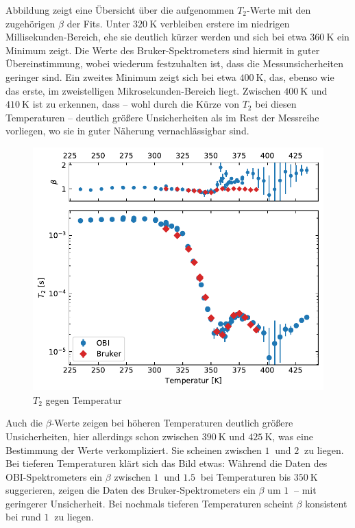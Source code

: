 Abbildung \label{fig:res:T_2} zeigt eine Übersicht über die aufgenommen $T_2$-Werte mit den zugehörigen $\beta$ der Fits. Unter $\SI{320}{\kelvin}$ verbleiben erstere im niedrigen Millisekunden-Bereich, ehe sie deutlich kürzer werden und sich bei etwa $\SI{360}{\kelvin}$ ein Minimum zeigt. Die Werte des Bruker-Spektrometers sind hiermit in guter Übereinstimmung, wobei wiederum festzuhalten ist, dass die Messunsicherheiten geringer sind. Ein zweites Minimum zeigt sich bei etwa $\SI{400}{\kelvin}$, das, ebenso wie das erste, im zweistelligen Mikrosekunden-Bereich liegt. Zwischen $\SI{400}{\kelvin}$ und $\SI{410}{\kelvin}$ ist zu erkennen, dass -- wohl durch die Kürze von $T_2$ bei diesen Temperaturen -- deutlich größere Unsicherheiten als im Rest der Messreihe vorliegen, wo sie in guter Näherung vernachlässigbar sind. 
\begin{figure}
	\begin{center}
		\includegraphics[width=\textwidth]{graphics/plot/t2.pdf}
	\end{center}
	\caption{$T_2$ gegen Temperatur} \label{fig:res:T_2}
\end{figure}
Auch die $\beta$-Werte zeigen bei höheren Temperaturen deutlich größere Unsicherheiten, hier allerdings schon zwischen $\SI{390}{\kelvin}$ und $\SI{425}{\kelvin}$, was eine Bestimmung der Werte verkompliziert. Sie scheinen zwischen $\SI{1}{}$ und $\SI{2}{}$ zu liegen. Bei tieferen Temperaturen klärt sich das Bild etwas: Während die Daten des OBI-Spektrometers ein $\beta$ zwischen $\SI{1}{}$ und $\SI{1.5}{}$ bei Temperaturen bis $\SI{350}{\kelvin}$ suggerieren, zeigen die Daten des Bruker-Spektrometers ein $\beta$ um $\SI{1}{}$ -- mit geringerer Unsicherheit. Bei nochmals tieferen Temperaturen scheint $\beta$ konsistent bei rund $\SI{1}{}$ zu liegen.





